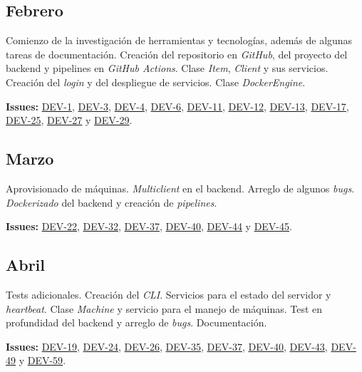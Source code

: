 \subsection{Febrero}
Comienzo de la investigación de herramientas y tecnologías, además de algunas tareas de documentación. Creación del repositorio en \textit{GitHub}, del proyecto del backend y pipelines en \textit{GitHub Actions}. Clase \textit{Item}, \textit{Client} y sus servicios. Creación del \textit{login} y del despliegue de servicios. Clase \textit{DockerEngine}.

\bigskip
\textbf{Issues:} \href{https://github.com/harvestcore/tfg/issues/1}{DEV-1}, \href{https://github.com/harvestcore/tfg/issues/3}{DEV-3}, \href{https://github.com/harvestcore/tfg/issues/4}{DEV-4}, \href{https://github.com/harvestcore/tfg/issues/6}{DEV-6}, \href{https://github.com/harvestcore/tfg/issues/11}{DEV-11}, \href{https://github.com/harvestcore/tfg/issues/12}{DEV-12}, \href{https://github.com/harvestcore/tfg/issues/13}{DEV-13}, \href{https://github.com/harvestcore/tfg/issues/17}{DEV-17}, \href{https://github.com/harvestcore/tfg/issues/25}{DEV-25}, \href{https://github.com/harvestcore/tfg/issues/27}{DEV-27} y \href{https://github.com/harvestcore/tfg/issues/29}{DEV-29}.


\subsection{Marzo}
Aprovisionado de máquinas. \textit{Multiclient} en el backend. Arreglo de algunos \textit{bugs}. \textit{Dockerizado} del backend y creación de \textit{pipelines}.

\bigskip
\textbf{Issues:} \href{https://github.com/harvestcore/tfg/issues/22}{DEV-22},  \href{https://github.com/harvestcore/tfg/issues/32}{DEV-32},  \href{https://github.com/harvestcore/tfg/issues/37}{DEV-37},  \href{https://github.com/harvestcore/tfg/issues/40}{DEV-40},  \href{https://github.com/harvestcore/tfg/issues/44}{DEV-44} y  \href{https://github.com/harvestcore/tfg/issues/45}{DEV-45}. 


\subsection{Abril}
Tests adicionales. Creación del \textit{CLI}. Servicios para el estado del servidor y \textit{heartbeat}. Clase \textit{Machine} y servicio para el manejo de máquinas. Test en profundidad del backend y arreglo de \textit{bugs}. Documentación.

\bigskip
\textbf{Issues:} \href{https://github.com/harvestcore/tfg/issues/19}{DEV-19},  \href{https://github.com/harvestcore/tfg/issues/24}{DEV-24},  \href{https://github.com/harvestcore/tfg/issues/26}{DEV-26},  \href{https://github.com/harvestcore/tfg/issues/35}{DEV-35},  \href{https://github.com/harvestcore/tfg/issues/37}{DEV-37},  \href{https://github.com/harvestcore/tfg/issues/40}{DEV-40},  \href{https://github.com/harvestcore/tfg/issues/43}{DEV-43},  \href{https://github.com/harvestcore/tfg/issues/49}{DEV-49} y  \href{https://github.com/harvestcore/tfg/issues/59}{DEV-59}.


